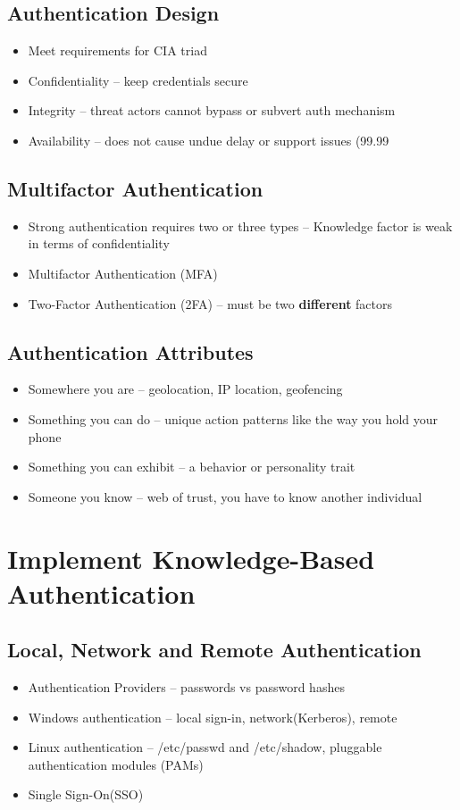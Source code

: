 	\subsection {Authentication Design}
		\begin{itemize}
			\item Meet requirements for CIA triad
			\item Confidentiality -- keep credentials secure
			\item Integrity -- threat actors cannot bypass or subvert auth mechanism
			\item Availability -- does not cause undue delay or support issues 
				(99.99%
		\end{itemize}
	\subsection {Multifactor Authentication}
		\begin{itemize}
			\item Strong authentication requires two or three types
				-- Knowledge factor is weak in terms of confidentiality
			\item Multifactor Authentication (MFA)
			\item Two-Factor Authentication (2FA) -- must be two \textbf{different}
				factors
		\end{itemize}
	\subsection {Authentication Attributes}
		\begin{itemize}
			\item Somewhere you are -- geolocation, IP location, geofencing
			\item Something you can do -- unique action patterns like the way you
				hold your phone
			\item Something you can exhibit -- a behavior or personality trait
			\item Someone you know -- web of trust, you have to know another individual
		\end{itemize}

\section {Implement Knowledge-Based Authentication}
	\subsection {Local, Network and Remote Authentication}
		\begin{itemize}
			\item Authentication Providers -- passwords vs password hashes
			\item Windows authentication -- local sign-in, network(Kerberos), remote
			\item Linux authentication -- /etc/passwd and /etc/shadow,
				pluggable authentication modules (PAMs)
			\item Single Sign-On(SSO)
		\end{itemize}
